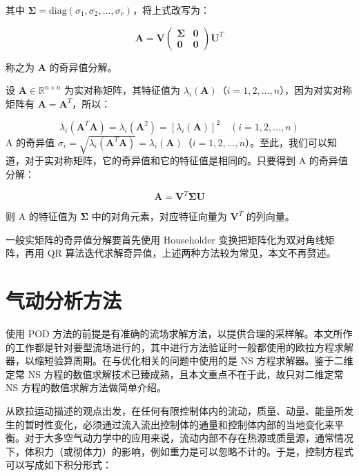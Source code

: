 其中 \(\mathbf{\Sigma} = \text{diag}(\sigma_1, \sigma_2, \ldots, \sigma_r)\)，将上式改写为：

\begin{equation}
\mathbf{A} = \mathbf{V} \begin{pmatrix} \mathbf{\Sigma} & \mathbf{0} \\ \mathbf{0} & \mathbf{0} \end{pmatrix} \mathbf{U}^T 
\end{equation}

称之为 \(\mathbf{A}\) 的奇异值分解。

设 \(\mathbf{A} \in \mathbb{R}^{n \times n}\) 为实对称矩阵，其特征值为 \(\lambda_i(\mathbf{A})\)（\(i = 1, 2, \ldots, n\)），因为对实对称矩阵有 \(\mathbf{A} = \mathbf{A}^T\)，所以：

\begin{equation}
\lambda_i(\mathbf{A}^T \mathbf{A}) = \lambda_i(\mathbf{A}^2) = \left[ \lambda_i(\mathbf{A}) \right]^2 \quad (i = 1, 2, \ldots, n) 
\end{equation}
A 的奇异值 \(\sigma_i = \sqrt{\lambda_i(\mathbf{A}^T \mathbf{A})} = \lambda_i(\mathbf{A})\)（\(i = 1, 2, \ldots, n\)）。至此，我们可以知道，对于实对称矩阵，它的奇异值和它的特征值是相同的。只要得到 A 的奇异值分解：

\begin{equation}
\mathbf{A} = \mathbf{V}^T \mathbf{\Sigma} \mathbf{U} 
\end{equation}

则 A 的特征值为 \(\mathbf{\Sigma}\) 中的对角元素，对应特征向量为 \(\mathbf{V}^T\) 的列向量。

一般实矩阵的奇异值分解要首先使用 Householder 变换把矩阵化为双对角线矩阵，再用 QR 算法迭代求解奇异值，上述两种方法较为常见，本文不再赘述。
\section{气动分析方法}
使用 POD 方法的前提是有准确的流场求解方法，以提供合理的采样解。本文所作的工作都是针对要型流场进行的，其中进行方法验证时一般都使用的欧拉方程求解器，以缩短验算周期。在与优化相关的问题中使用的是 NS 方程求解器。鉴于二维定常 NS 方程的数值求解技术已臻成熟，且本文重点不在于此，故只对二维定常 NS 方程的数值求解方法做简单介绍。

从欧拉运动描述的观点出发，在任何有限控制体内的流动，质量、动量、能量所发生的暂时性变化，必须通过流入流出控制体的通量和控制体内部的当地变化来平衡。对于大多空气动力学中的应用来说，流动内部不存在热源或质量源，通常情况下，体积力（或彻体力）的影响，例如重力是可以忽略不计的。于是，控制方程式可以写成如下积分形式：

